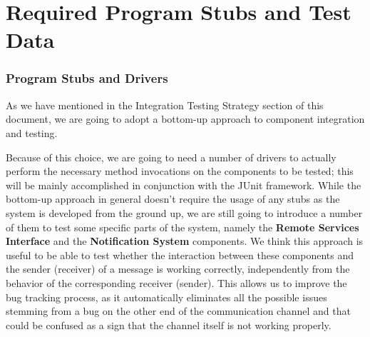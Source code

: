 \chapter{Required Program Stubs and Test Data}
\subsection{Program Stubs and Drivers}
As we have mentioned in the Integration Testing Strategy section of this document, we are going to adopt a bottom-up approach to component integration and testing.

Because of this choice, we are going to need a number of drivers to actually perform the necessary method invocations on the components to be tested; this will be mainly accomplished in conjunction with the JUnit framework. While the bottom-up approach in general doesn't require the usage of any stubs as the system is developed from the ground up, we are still going to introduce a number of them to test some specific parts of the system, namely the \textbf{Remote Services Interface} and the \textbf{Notification System} components. We think this approach is useful to be able to test whether the interaction between these components and the sender (receiver) of a message is working correctly, independently from the behavior of the corresponding receiver (sender). This allows us to improve the bug tracking process, as it automatically eliminates all the possible issues stemming from a bug on the other end of the communication channel and that could be confused as a sign that the channel itself is not working properly. 

